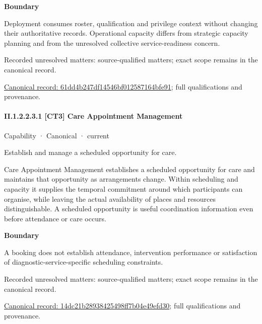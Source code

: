 \textbf{Boundary}



Deployment consumes roster, qualification and privilege context without changing their authoritative records. Operational capacity differs from strategic capacity planning and from the unresolved collective service-readiness concern.


{\small Recorded unresolved matters: source-qualified matters; exact scope remains in the canonical record.}\par
{\footnotesize \href{../../../../continuum/strategy/capability/61dd4b247df14546bf012587164bfe91.md}{Canonical record: 61dd4b247df14546bf012587164bfe91}; full qualifications and provenance.}\par
\paragraph*{II.1.2.2.3.1 [CT3] Care Appointment Management}
\label{navigation:II.1.2.2.3.1}

\label{element:14dc21b28938425498ff7b04e49efd30}
{\small Capability · Canonical · current}\par

Establish and manage a scheduled opportunity for care.



Care Appointment Management establishes a scheduled opportunity for care and maintains that opportunity as arrangements change. Within scheduling and capacity it supplies the temporal commitment around which participants can organise, while leaving the actual availability of places and resources distinguishable. A scheduled opportunity is useful coordination information even before attendance or care occurs.



\textbf{Boundary}



A booking does not establish attendance, intervention performance or satisfaction of diagnostic-service-specific scheduling constraints.


{\small Recorded unresolved matters: source-qualified matters; exact scope remains in the canonical record.}\par
{\footnotesize \href{../../../../continuum/strategy/capability/14dc21b28938425498ff7b04e49efd30.md}{Canonical record: 14dc21b28938425498ff7b04e49efd30}; full qualifications and provenance.}\par
